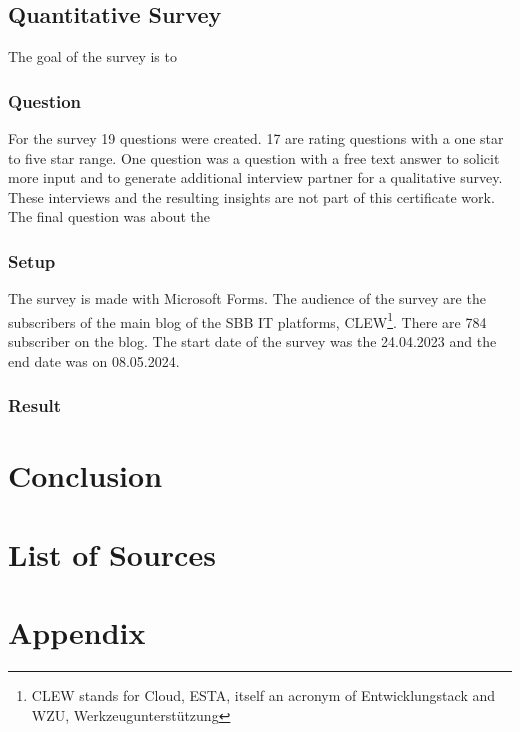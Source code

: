 \documentclass[a4paper,12pt]{article}
\begin{document}
    \subsection{Quantitative Survey}
    The goal of the survey is to

    \subsubsection{Question}
    For the survey 19 questions were created.
    17 are rating questions with a one star to five star range.
    One question was a question with a free text answer to solicit more input and to generate additional interview partner
    for a qualitative survey.
    These interviews and the resulting insights are not part of this certificate work.
    The final question was about the

    \subsubsection{Setup}
    The survey is made with Microsoft Forms.
    The audience of the survey are the subscribers of the main blog of the SBB IT platforms, CLEW\footnote{CLEW stands for Cloud, ESTA, itself an acronym of Entwicklungstack and WZU, Werkzeugunterstützung}.
    There are 784 subscriber on the blog.
    The start date of the survey was the 24.04.2023 and the end date was on 08.05.2024.

    \subsubsection{Result}


    \section{Conclusion}
    \label{sec:conclusion}
    \pagebreak


    \section{List of Sources}
    \label{sec:bibliograhpy}
    \printbibliography[heading=none]


    \section{Appendix}
    \label{sec:appendix}
\end{document}
